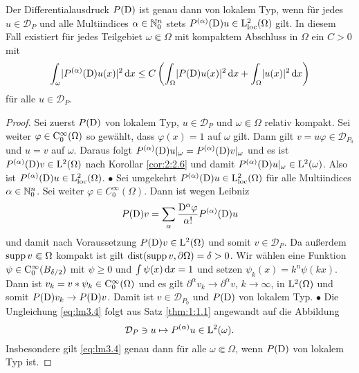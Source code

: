 \begin{lem}\label{lem : loktyp}
Der Differentialausdruck $P(\mathrm D)$ ist genau dann von lokalem Typ, wenn für jedes $u\in\mathcal D_P$ und alle Multiindices $\alpha\in\mathbb N_0^n$ stets $P^{(\alpha)}(\mathrm D)u \in \mathrm L^2_{\rm loc}(\Omega)$ gilt. In diesem Fall existiert für jedes Teilgebiet $\omega\Subset \Omega$ mit kompaktem Abschluss in $\Omega$ ein $C>0$ mit
\begin{equation}
\int_{\omega} \lvert P^{(\alpha)}(\mathrm D)u(x)\rvert^2\,\mathrm d x\leq C\left( \int_{\Omega} \lvert P(\mathrm D)u(x)\rvert^2\,\mathrm d x + \int_{\Omega} \lvert u(x)\rvert^2 \,\mathrm d x \right) \label{eq:lm3.4}
\end{equation}
für alle $u\in\mathcal{D}_P$.
\end{lem}
\begin{proof}
Sei zuerst $P(\mathrm D)$ von lokalem Typ, $u\in\mathcal{D}_P$ und $\omega\Subset\Omega$ relativ kompakt. Sei weiter $\varphi\in\mathrm C_0^\infty(\Omega)$ so gewählt, dass $\varphi(x)=1$ auf $\omega$ gilt. Dann gilt $v=u\varphi\in\mathcal D_{P_0}$ und $u=v$ auf $\omega$. Daraus folgt $P^{(\alpha)}(\mathrm D)u|_\omega=P^{(\alpha)}(\mathrm D)v|_\omega$ und es ist $P^{(\alpha)}(\mathrm D)v\in\mathrm L^2(\Omega)$ nach Korollar \ref{cor:2:2.6} und damit $P^{(\alpha)}(\mathrm D)u|_\omega \in\mathrm L^2(\omega)$. 
Also ist $P^{(\alpha)}(\mathrm D)u \in \mathrm L^2_{\rm loc}(\Omega)$. $\bullet$\qquad
Sei umgekehrt $P^{(\alpha)}(\mathrm D)u \in \mathrm L^2_{\rm loc}(\Omega)$ für alle Multiindices $\alpha\in\mathbb N_0^n$. Sei weiter $\varphi\in C_0^\infty(\Omega)$. Dann ist wegen Leibniz
\begin{equation}
P(\mathrm D)v=\sum_\alpha \dfrac{\mathrm D^\alpha \varphi}{{\alpha}!}P^{(\alpha)}(\mathrm D)u
\end{equation}
und damit nach Voraussetzung $P(\mathrm D)v\in \mathrm L^2(\Omega)$ und somit $v\in\mathcal{D}_P$. Da außerdem $\operatorname{supp} v\Subset\Omega$ kompakt ist gilt $\operatorname{dist}(\operatorname{supp} v,\partial\Omega)=\delta>0$. Wir wählen eine Funktion $\psi\in\mathrm C_0^\infty(B_{\delta/2})$ mit $\psi\ge0$ und $\int\psi(x)\,\mathrm d x=1$ und setzen $\psi_k(x)=k^{n} \psi(k x)$. Dann ist
$v_k=v*\psi_k\in\mathrm C_0^\infty(\Omega)$ und es gilt $\partial^\alpha v_k\to \partial^\alpha v$, $k\to\infty$, in $\mathrm L^2(\Omega)$ 
und somit $P(\mathrm D)v_k\to P(\mathrm D)v$. Damit ist $v\in \mathcal{D}_{P_0}$ und $P(\mathrm D)$ von lokalem Typ. $\bullet$ \qquad 
Die Ungleichung \eqref{eq:lm3.4} folgt aus Satz \ref{thm:1:1.1} angewandt auf die Abbildung
\begin{equation}
\mathcal{D}_P \ni u \mapsto P^{(\alpha)}u\in \mathrm L^2(\omega).
\end{equation}
Insbesondere gilt \eqref{eq:lm3.4} genau dann für alle $\omega\Subset\Omega$, wenn $P(\mathrm D)$ von lokalem Typ ist.
\end{proof}


